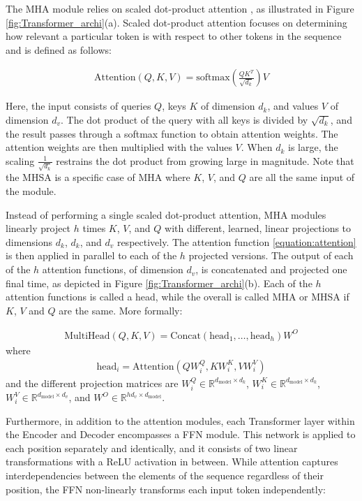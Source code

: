The \ac{MHA} module relies on scaled dot-product attention \cite{vaswani2017attention}, as illustrated in Figure \ref{fig:Transformer_archi}(a). Scaled dot-product attention focuses on determining how relevant a particular token is with respect to other tokens in the sequence and is defined as follows:

\begin{align}
\text{Attention}(Q, K, V) = \text{softmax}\left(\frac{QK^T}{\sqrt{d_k}}\right)V
\label{equation:attention}
\end{align}


Here, the input consists of queries $Q$, keys $K$ of dimension $d_k$, and values $V$ of dimension $d_v$. The dot product of the query with all keys is divided by $\sqrt{d_k}$, and the result passes through a softmax function to obtain attention weights. The attention weights are then multiplied with the values $V$. When $d_k$ is large, the scaling  $\frac{1}{\sqrt{d_k}}$ restrains the dot product from growing large in magnitude. Note that the \ac{MHSA} is a specific case of \ac{MHA} where $K$, $V$, and $Q$ are all the same input of the module. 

Instead of performing a single scaled dot-product attention, \ac{MHA} modules linearly project $h$ times $K$, $V$, and $Q$ with different, learned, linear projections to dimensions $d_k$, $d_k$, and $d_v$ respectively. The attention function \ref{equation:attention} is then applied in parallel to each of the $h$ projected versions. The output of each of the $h$ attention functions, of dimension $d_v$, is concatenated and projected one final time, as depicted in Figure \ref{fig:Transformer_archi}(b). Each of the $h$ attention functions is called a head, while the overall is called \ac{MHA} or \ac{MHSA} if $K$, $V$ and $Q$ are the same. More formally:

\begin{align}
\text{MultiHead}(Q, K, V) = \text{Concat}(\text{head}_1, \dots, \text{head}_h)W^O
\end{align}
where
\begin{align}
\text{head}_i = \text{Attention}(QW_i^Q, KW_i^K, VW_i^V)
\end{align}
and the different projection matrices are $W_i^Q \in \mathbb{R}^{d_{\text{model}} \times d_k}$, $W_i^K \in \mathbb{R}^{d_{\text{model}} \times d_k}$, $W_i^V \in \mathbb{R}^{d_{\text{model}} \times d_v}$, and $W^O \in \mathbb{R}^{hd_{v} \times d_{\text{model}}}$.


Furthermore, in addition to the attention modules, each Transformer layer within the Encoder and Decoder encompasses a \ac{FFN} module. This network is applied to each position separately and identically, and it consists of two linear transformations with a \ac{ReLU} activation in between. While attention captures interdependencies between the elements of the sequence regardless of their position, the \ac{FFN} non-linearly transforms each input token independently:

